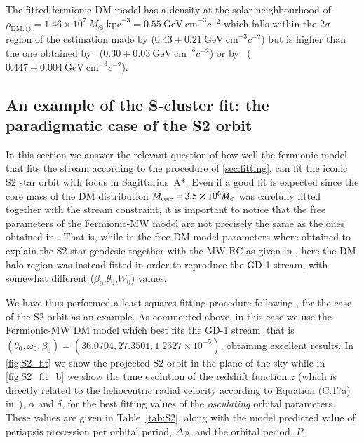 \documentclass[twocolumn]{aa}
\begin{document}
The fitted fermionic DM model has a density at the solar neighbourhood of
$\rho_{\mathrm{DM},\odot}=1.46\times10^7~M_\odot~\mathrm{kpc}^{-3}=0.55~\mathrm{GeV~cm}^{-3} c^{-2}$ which falls within the $2\sigma$ region of the estimation made by \citealt{Salucci2010} ($0.43\pm 0.21~\mathrm{GeV~cm}^{-3} c^{-2}$)
but is higher than the one obtained by~\citealt{Eilers_2019} ($0.30\pm0.03~\mathrm{GeV~cm}^{-3} c^{-2}$) or by~\citealt{Ou_2024MNRAS} ($0.447\pm0.004~\mathrm{GeV~cm}^{-3} c^{-2}$).

\subsection{An example of the S-cluster fit: the paradigmatic case of the S2 orbit}
In this section we answer the relevant question of how well the fermionic model that fits the stream according to the procedure of \cref{sec:fitting}, can fit the iconic S2 star orbit with focus in Sagittarius~A*. Even if a good fit is expected since the core mass of the DM distribution $M_{\rm{core}}=3.5\times 10^6 M_\odot$ was carefully fitted together with the stream constraint, it is important to notice that the free parameters of the Fermionic-MW model are not precisely the same as the ones obtained in \cite{2020A&A...641A..34B}. That is, while in \cite{2020A&A...641A..34B} the free DM model parameters where obtained to explain the S2 star geodesic together with the MW RC as given in \cite{sofue_rotation_2013}, here the DM halo region was instead fitted in order to reproduce the GD-1 stream, with somewhat different ($\beta_0$,$\theta_0$,$W_0$) values.

We have thus performed a least squares fitting procedure following \cite{2020A&A...641A..34B}, for the case of the S2 orbit as an example. As commented above, in this case we use the Fermionic-MW DM model which best fits the GD-1 stream, that is $(\theta_0, \omega_0, \beta_0)= (36.0704, 27.3501, 1.2527\times10^{-5})$, obtaining excellent results. In \cref{fig:S2_fit}  we show the projected S2 orbit in the plane of the sky while in \cref{fig:S2_fit_b} we show the time evolution of the redshift function $z$ (which is directly related to the heliocentric radial velocity according to Equation (C.17a) in~\citealp{2020A&A...641A..34B}), $\alpha$ and $\delta$, for the best fitting values of the \textit{osculating} orbital parameters. These values are given in Table~\ref{tab:S2}, along with the model predicted value of periapsis precession per orbital period, $\Delta \phi$, and the orbital period, $P$.
\end{document}
